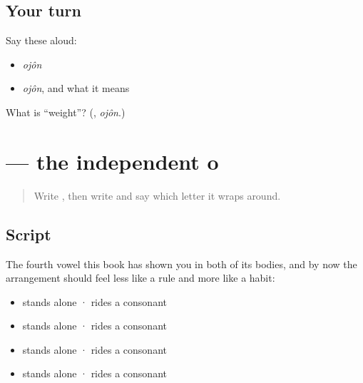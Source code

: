 \subsection*{Your turn}
Say these aloud:

\begin{itemize}
\raggedright
  \item \emph{ojôn}
  \item \emph{ojôn}, and what it means
\end{itemize}

\begin{tcolorbox}[breakable,colback=teal!4,colframe=teal!35!black,title={Before you move on}]
What is \textquotedblleft{}weight\textquotedblright{}? (\textbf{}, \emph{ojôn}.)
\end{tcolorbox}
\section[\texorpdfstring{\bn{ও} (o)}{ও (o)}]{ — the independent o}

\label{lesson:BN-W04-o-indep}



\begin{quote}
Write \textbf{}, then write \textbf{} and say which letter it wraps around.
\end{quote}

\subsection*{Script}

\begin{quote}
\end{quote}

The fourth vowel this book has shown you in both of its bodies, and by now the arrangement should feel less like a rule and more like a habit:

\begin{itemize}
\raggedright
  \item \textbf{} stands alone · \textbf{} rides a consonant
  \item \textbf{} stands alone · \textbf{} rides a consonant
  \item \textbf{} stands alone · \textbf{} rides a consonant
  \item \textbf{} stands alone · \textbf{} rides a consonant
\end{itemize}

